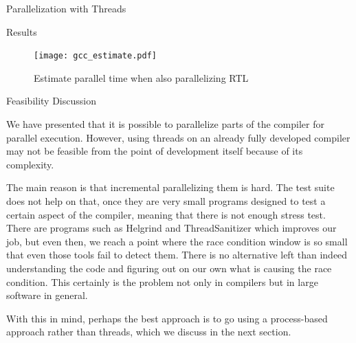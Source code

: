 \begin{section}{Parallelization with Threads}
\begin{subsection}{Results}
\begin{figure}[ht]
 \centering
 \texttt{[image: gcc\_estimate.pdf]}
 \caption{Estimate parallel time when also parallelizing RTL}
 \label{fig:parallel_estimate}
\end{figure}

\end{subsection}

\begin{subsection}{Feasibility Discussion}

We have presented that it is possible to parallelize parts of the compiler for
parallel execution. However, using threads on an already fully developed
compiler may not be feasible from the point of development itself because of
its complexity.

The main reason is that incremental parallelizing them is hard. The test suite
does not help on that, once they are very small programs designed to test a
certain aspect of the compiler, meaning that there is not enough stress test.
There are programs such as Helgrind and ThreadSanitizer which improves our job,
but even then, we reach a point where the race condition window is so small
that even those tools fail to detect them. There is no alternative left than
indeed understanding the code and figuring out on our own what is causing the
race condition. This certainly is the problem not only in compilers but in
large software in general.

With this in mind, perhaps the best approach is to go using a process-based
approach rather than threads, which we discuss in the next section.

\end{subsection}

\end{section}

